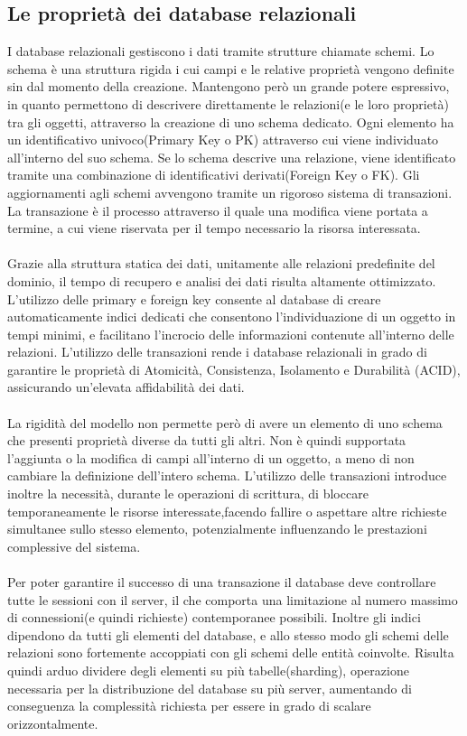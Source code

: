 \subsection{Le proprietà dei database relazionali}


I database relazionali gestiscono i dati tramite strutture chiamate schemi.
Lo schema è una struttura rigida i cui campi e le relative proprietà
vengono definite sin dal momento della creazione.
Mantengono però un grande potere espressivo,
in quanto permettono di descrivere direttamente le relazioni(e le loro proprietà) tra gli oggetti,
attraverso la creazione di uno schema dedicato.
Ogni elemento ha un identificativo univoco(Primary Key o PK)
attraverso cui viene individuato all'interno del suo schema.
Se lo schema descrive una relazione, viene identificato tramite
una combinazione di identificativi derivati(Foreign Key o FK).
Gli aggiornamenti agli schemi avvengono tramite un rigoroso sistema di transazioni.
La transazione è il processo attraverso il quale una modifica viene portata a termine,
a cui viene riservata per il tempo necessario la risorsa interessata.\\
\\
Grazie alla struttura statica dei dati, unitamente alle relazioni predefinite del dominio,
il tempo di recupero e analisi dei dati risulta altamente ottimizzato.
L'utilizzo delle primary e foreign key consente al database di creare automaticamente indici
dedicati che consentono l'individuazione di un oggetto in tempi minimi,
e facilitano l'incrocio delle informazioni contenute all'interno delle relazioni.
L'utilizzo delle transazioni rende i database relazionali in grado di garantire
le proprietà di Atomicità, Consistenza, Isolamento e Durabilità (ACID),
assicurando un’elevata affidabilità dei dati.\\
\\
La rigidità del modello non permette però di avere un elemento
di uno schema che presenti proprietà diverse da tutti gli altri.
Non è quindi supportata l'aggiunta o la modifica di campi all'interno di un oggetto,
a meno di non cambiare la definizione dell'intero schema.
L'utilizzo delle transazioni introduce inoltre la necessità, durante le operazioni di scrittura,
di bloccare temporaneamente le risorse interessate,facendo fallire o aspettare altre richieste simultanee sullo stesso elemento,
potenzialmente influenzando le prestazioni complessive del sistema.\\
\\
Per poter garantire il successo di una transazione
il database deve controllare tutte le sessioni con il server,
il che comporta una limitazione al numero massimo di connessioni(e quindi richieste) contemporanee possibili.
Inoltre gli indici dipendono da tutti gli elementi del database,
e allo stesso modo gli schemi delle relazioni sono
fortemente accoppiati con gli schemi delle entità coinvolte.
Risulta quindi arduo dividere degli elementi su più tabelle(sharding),
operazione necessaria per la distribuzione del database su più server,
aumentando di conseguenza la complessità richiesta per essere in grado di scalare orizzontalmente.\\
\\

